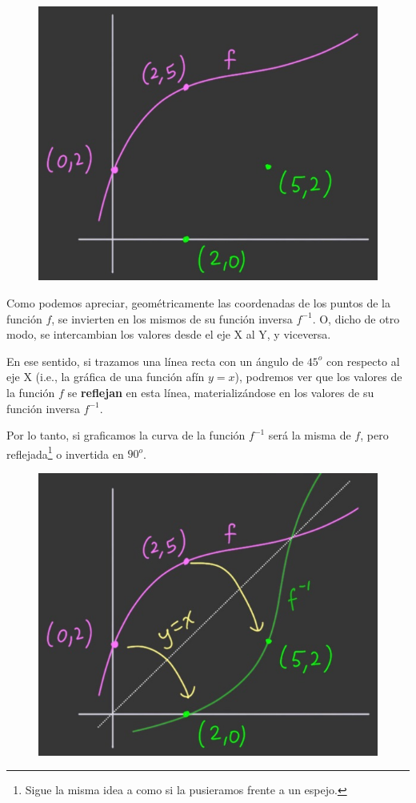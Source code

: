\documentclass[12pt]{article}
\begin{document}
\begin{figure}[hbt!]
\centering
\includegraphics[scale=0.45]{img/inverse-fun-2.jpg}
\end{figure}

Como podemos apreciar, geométricamente las coordenadas de los puntos de la función $f$, se invierten en los mismos de su función inversa $f^{-1}$. O, dicho de otro modo, se intercambian los valores desde el eje X al Y, y viceversa.

En ese sentido, si trazamos una línea recta con un ángulo de $45^{o}$ con respecto al eje X (i.e., la gráfica de una función afín $y = x$), podremos ver que los valores de la función $f$ se \textbf{reflejan} en esta línea, materializándose en los valores de su función inversa $f^{-1}$.

Por lo tanto, si graficamos la curva de la función $f^{-1}$ será la misma de $f$, pero reflejada\footnote{Sigue la misma idea a como si la pusieramos frente a un espejo.} o invertida en $90^{o}$.

\newpage

\begin{figure}[hbt!]
\centering
\includegraphics[scale=0.45]{img/inverse-fun-3.jpg}
\end{figure}
\end{document}
